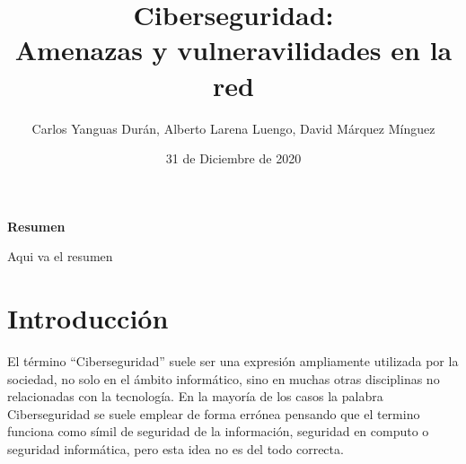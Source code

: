  
  
  

\graphicspath{{../Book/figures/}{../Book/diagrams/}{../Book/photos/}} 

 
\title{{\Huge Ciberseguridad: \\ Amenazas y vulneravilidades en la red}}
\date{{\large 31 de Diciembre de 2020}}
\author{{\Large  Carlos Yanguas Durán, Alberto Larena Luengo, David Márquez Mínguez}}



\maketitle
\thispagestyle{empty}\null\newpage




\setcounter{page}{1}
\begin{center}
 {\bfseries \Large Resumen}
\end{center}

Aqui va el resumen


                  




\hypersetup{linkcolor=blue}

                        
\chapter{Introducción}
\label{cha:introduccion}

El término “Ciberseguridad” suele ser una expresión ampliamente utilizada por la sociedad, no solo en el ámbito 
informático, sino en muchas otras disciplinas no relacionadas con la tecnología. En la mayoría de los casos la palabra 
Ciberseguridad se suele emplear de forma errónea pensando que el termino funciona como símil de seguridad de la 
información, seguridad en computo o seguridad informática, pero esta idea no es del todo correcta.

